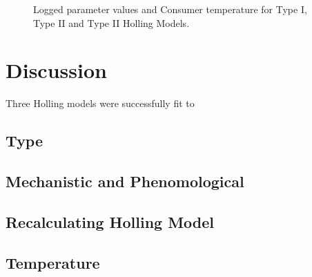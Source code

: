 \documentclass{article}
\begin{document}
\begin{figure}[h!t]
\caption{Logged parameter values and Consumer temperature for Type I, Type II and Type II Holling Models.}
\label{fig:tempparam}
\end{figure}
\section{Discussion}
Three Holling models were successfully fit to 
\subsection{Type}
\subsection{Mechanistic and Phenomological }
\subsection{Recalculating Holling Model}
\subsection{Temperature}
\end{document}
